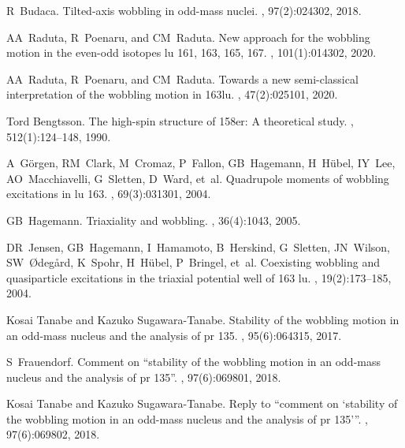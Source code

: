 \documentclass[11pt]{article}
\begin{document}
\begin{thebibliography}{99}
R~Budaca.
\newblock Tilted-axis wobbling in odd-mass nuclei.
, 97(2):024302, 2018.

AA~Raduta, R~Poenaru, and CM~Raduta.
\newblock New approach for the wobbling motion in the even-odd isotopes lu 161,
  163, 165, 167.
, 101(1):014302, 2020.

AA~Raduta, R~Poenaru, and CM~Raduta.
\newblock Towards a new semi-classical interpretation of the wobbling motion in
  163lu.
,
  47(2):025101, 2020.

Tord Bengtsson.
\newblock The high-spin structure of 158er: A theoretical study.
, 512(1):124--148, 1990.

A~G{\"o}rgen, RM~Clark, M~Cromaz, P~Fallon, GB~Hagemann, H~H{\"u}bel, IY~Lee,
  AO~Macchiavelli, G~Sletten, D~Ward, et~al.
\newblock Quadrupole moments of wobbling excitations in lu 163.
, 69(3):031301, 2004.

GB~Hagemann.
\newblock Triaxiality and wobbling.
, 36(4):1043, 2005.

DR~Jensen, GB~Hagemann, I~Hamamoto, B~Herskind, G~Sletten, JN~Wilson,
  SW~{\O}deg{\aa}rd, K~Spohr, H~H{\"u}bel, P~Bringel, et~al.
\newblock Coexisting wobbling and quasiparticle excitations in the triaxial
  potential well of 163 lu.
,
  19(2):173--185, 2004.

Kosai Tanabe and Kazuko Sugawara-Tanabe.
\newblock Stability of the wobbling motion in an odd-mass nucleus and the
  analysis of pr 135.
, 95(6):064315, 2017.

S~Frauendorf.
\newblock Comment on “stability of the wobbling motion in an odd-mass nucleus
  and the analysis of pr 135”.
, 97(6):069801, 2018.

Kosai Tanabe and Kazuko Sugawara-Tanabe.
\newblock Reply to “comment on ‘stability of the wobbling motion in an
  odd-mass nucleus and the analysis of pr 135’”.
, 97(6):069802, 2018.


\end{thebibliography}
\end{document}
